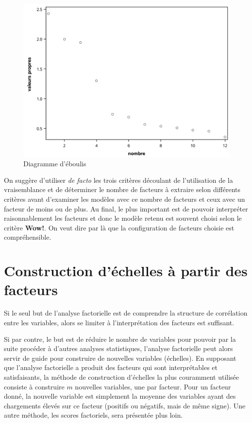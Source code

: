 \documentclass[
  11pt,
  letterpaper,
]{book}
\theoremstyle{definition}
\theoremstyle{definition}
\theoremstyle{definition}
\theoremstyle{remark}
\begin{document}
\begin{figure}

{\centering \includegraphics[width=0.65\linewidth]{figures/01-facto-e6} 

}

\caption{Diagramme d'éboulis}\label{fig:fig1p6}
\end{figure}

On suggère d'utiliser \emph{de facto} les trois critères découlant de l'utilisation de la vraisemblance et de déterminer le nombre de facteurs à extraire selon différents critères avant d'examiner les modèles avec ce nombre de facteurs et ceux
avec un facteur de moins ou de plus. Au final, le plus important est de pouvoir interpréter raisonnablement les facteurs et donc le modèle retenu est souvent choisi selon le critère \textbf{Wow!}. On veut dire par là que la configuration de facteurs choisie est compréhensible.

\hypertarget{construction-duxe9chelles-uxe0-partir-des-facteurs}{%
\section{Construction d'échelles à partir des facteurs}\label{construction-duxe9chelles-uxe0-partir-des-facteurs}}

Si le seul but de l'analyse factorielle est de comprendre la structure de corrélation entre les variables, alors se limiter à l'interprétation des facteurs est suffisant.

Si par contre, le but est de réduire le nombre de variables pour pouvoir par la suite procéder à d'autres analyses statistiques, l'analyse factorielle peut alors servir de guide pour construire de nouvelles variables (échelles). En supposant que l'analyse factorielle a produit des facteurs qui sont interprétables et satisfaisants, la méthode de construction d'échelles la plus couramment utilisée consiste à construire \(m\) nouvelles variables, une par facteur. Pour un facteur donné, la nouvelle variable est simplement la moyenne des variables ayant des chargements élevés sur ce facteur (positifs ou négatifs, mais de même signe). Une autre méthode, les scores factoriels, sera présentée plus loin.
\end{document}
